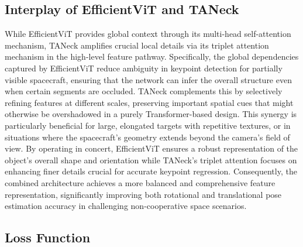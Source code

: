 \documentclass[a4paper,fleqn]{cas-sc}
\begin{document}
\subsection{Interplay of EfficientViT and TANeck}
While EfficientViT provides global context through its multi-head self-attention mechanism, TANeck amplifies crucial local details via its triplet attention mechanism in the high-level feature pathway. Specifically, the global dependencies captured by EfficientViT reduce ambiguity in keypoint detection for partially visible spacecraft, ensuring that the network can infer the overall structure even when certain segments are occluded. TANeck complements this by selectively refining features at different scales, preserving important spatial cues that might otherwise be overshadowed in a purely Transformer-based design. This synergy is particularly beneficial for large, elongated targets with repetitive textures, or in situations where the spacecraft’s geometry extends beyond the camera’s field of view. By operating in concert, EfficientViT ensures a robust representation of the object’s overall shape and orientation while TANeck’s triplet attention focuses on enhancing finer details crucial for accurate keypoint regression. Consequently, the combined architecture achieves a more balanced and comprehensive feature representation, significantly improving both rotational and translational pose estimation accuracy in challenging non-cooperative space scenarios.

\subsection{Loss Function}
\end{document}
